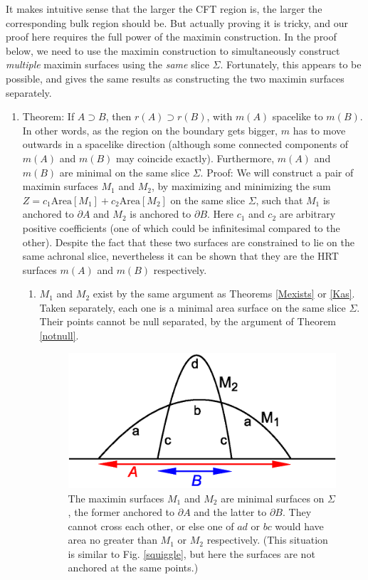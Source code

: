 \documentclass[12pt]{article}
\begin{document}
It makes intuitive sense that the larger the CFT region is, the larger the corresponding bulk region should be.  But actually proving it is tricky, and our proof here requires the full power of the maximin construction.  In the proof below, we need to use the maximin construction to simultaneously construct \emph{multiple} maximin surfaces using the \emph{same} slice $\Sigma$.  Fortunately, this appears to be possible, and gives the same results as constructing the two maximin surfaces separately.

\begin{enumerate}[resume]
\item \label{outward} Theorem: If $A \supset B$, then $r(A) \supset r(B)$, with $m(A)$ spacelike to $m(B)$.  In other words, as the region on the boundary gets bigger, $m$ has to move outwards in a spacelike direction (although some connected components of $m(A)$ and $m(B)$ may coincide exactly).  Furthermore, $m(A)$ and $m(B)$ are minimal on the same slice $\Sigma$.  Proof: We will construct a pair of maximin surfaces $M_1$ and $M_2$, by maximizing and minimizing the sum $Z = c_1 \mathrm{Area}[M_1] + c_2 \mathrm{Area}[M_2]$ on the same slice $\Sigma$, such that $M_1$ is anchored to $\partial A$ and $M_2$ is anchored to $\partial B$.  Here $c_1$ and $c_2$ are arbitrary positive coefficients (one of which could be infinitesimal compared to the other).  Despite the fact that these two surfaces are constrained to lie on the same achronal slice, nevertheless it can be shown that they are the HRT surfaces $m(A)$ and $m(B)$ respectively.
	\begin{enumerate}
	\item $M_1$ and $M_2$ exist by the same argument as Theorems \ref{Mexists} or \ref{Kas}.  Taken separately, each one is a minimal area surface on the same slice $\Sigma$.  Their points cannot be null separated, by the argument of Theorem \ref{notnull}.
\begin{figure}[hbt]
\centering
\includegraphics[width=.5\textwidth]{cross.eps}
\caption{\footnotesize The maximin surfaces $M_1$ and $M_2$ are minimal surfaces on $\Sigma$, the former anchored to $\partial A$ and the latter to $\partial B$.  They cannot cross each other, or else one of $ad$ or $bc$ would have area no greater than $M_1$ or $M_2$ respectively.  (This situation is similar to Fig. \ref{squiggle}, but here the surfaces are not anchored at the same points.)
}
\end{figure}
\end{enumerate}
\end{enumerate}
\end{document}
